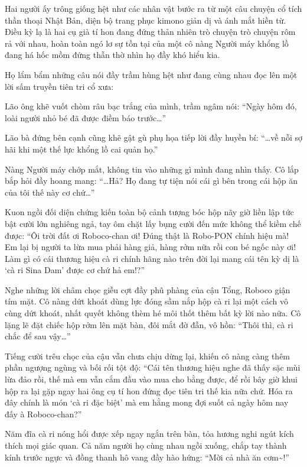 \documentclass[../main.tex]{subfiles}
\begin{document}
Hai người ấy trông giống hệt như các nhân vật bước ra từ một câu chuyện cổ tích thần thoại Nhật Bản, diện bộ trang phục kimono giản dị và ánh mắt hiền từ. Điều kỳ lạ là hai cụ già tí hon đang đứng thản nhiên trò chuyện trò chuyện rôm rả với nhau, hoàn toàn ngó lơ sự tồn tại của một cô nàng Người máy khổng lồ đang há hốc mồm đứng thẫn thờ nhìn họ đầy khó hiểu kia.


Họ lẩm bẩm những câu nói đầy trầm hùng hệt như đang cùng nhau đọc lên một lời sấm truyền tiên tri cổ xưa:

Lão ông khẽ vuốt chòm râu bạc trắng của mình, trầm ngâm nói: ``Ngày hôm đó, loài người nhỏ bé đã được điềm báo trước\dots''

Lão bà đứng bên cạnh cũng khẽ gật gù phụ họa tiếp lời đầy huyền bí: ``\dots về nỗi sợ hãi khi một thế lực khổng lồ cai quản họ.''

Nàng Người máy chớp mắt, không tin vào những gì mình đang nhìn thấy. Cô lắp bắp hỏi đầy hoang mang: ``\dots Hả? Họ đang tự tiện nói cái gì bên trong cái hộp ăn của tôi thế này cơ chứ\dots''


Kuon ngồi đối diện chứng kiến toàn bộ cảnh tượng bóc hộp nãy giờ liền lập tức bật cười lớn nghiêng ngả, tay ôm chặt lấy bụng cười đến mức không thể kiềm chế được: ``Ôi trời đất ơi Roboco-chan ơi! Đúng thật là Robo-PON chính hiệu mà! Em lại bị người ta lừa mua phải hàng giả, hàng rởm nữa rồi con bé ngốc này ơi! Làm gì có cái thương hiệu cà ri chính hãng nào trên đời lại mang cái tên kỳ dị là `cà ri Sina Dam' được cơ chứ hả em!?''

Nghe những lời châm chọc giễu cợt đầy phũ phàng của cậu Tổng, Roboco giận tím mặt. Cô nàng dứt khoát dùng lực đóng sầm nắp hộp cà ri lại một cách vô cùng dứt khoát, nhất quyết không thèm hé môi thốt thêm bất kỳ lời nào nữa. Cô lặng lẽ đặt chiếc hộp rởm lên mặt bàn, đôi mắt đờ đẫn, vô hồn: ``Thôi thì, cà ri chắc để sau vậy\dots''

Tiếng cười trêu chọc của cậu vẫn chưa chịu dừng lại, khiến cô nàng càng thêm phần ngượng ngùng và bối rối tột độ: ``Cái tên thương hiệu nghe đã thấy sặc mùi lừa đảo rồi, thế mà em vẫn cắm đầu vào mua cho bằng được, để rồi bây giờ khui hộp ra lại gặp ngay hai ông cụ tí hon đứng đọc tiên tri thế kia nữa chứ. Hóa ra đây chính là món `cà ri đặc biệt' mà em hằng mong đợi suốt cả ngày hôm nay đấy à Roboco-chan?''


Năm đĩa cà ri nóng hổi được xếp ngay ngắn trên bàn, tỏa hương nghi ngút kích thích mọi giác quan. Cả năm người họ cùng nhau ngồi xuống, chắp tay thành kính trước ngực và đồng thanh hô vang đầy hào hứng: ``Mời cả nhà ăn cơm\~{}!''
\end{document}
